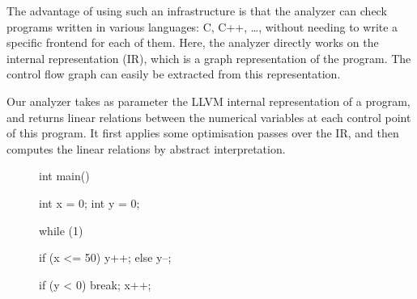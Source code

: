 \documentclass[a4paper,english,titlepage,11pt]{report}
\begin{document}
The advantage of using such an infrastructure is that the analyzer can check
programs written in various languages: C, C++, \dots, without needing to write
a specific frontend for each of them. Here, the analyzer directly works on the
internal representation (IR), which is a graph representation of
the program. The control flow graph can easily be extracted from
this representation.

Our analyzer takes as parameter the LLVM internal representation of a program,
and returns linear relations between the numerical variables at each control
point of this program. It first applies some optimisation passes over the IR,
and then computes the linear relations by abstract interpretation.

\begin{figure}[!h]
\begin{minipage}[c]{.35\linewidth}
{\small
\begin{C}
int main() {
   int x = 0;
   int y = 0;

   while (1) {
      if (x <= 50) y++;
      else y--;

      if (y < 0) break;
      x++;
   }
}
\end{C}
}
\end{minipage}
\begin{minipage}[c]{.69\linewidth}


\end{minipage}
\end{figure}
\end{document}
